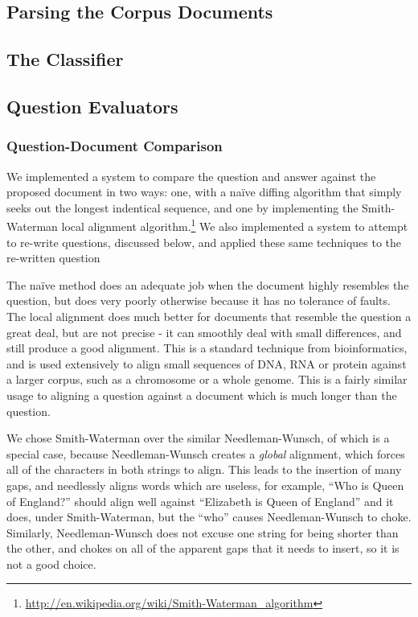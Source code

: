 \documentclass{article}
\begin{document}
\subsection{Parsing the Corpus Documents}

\subsection{The Classifier}

\subsection{Question Evaluators}

\subsubsection{Question-Document Comparison}

	We implemented a system to compare the question and answer against the
	proposed document in two ways:  one, with a na\"ive diffing algorithm that
	simply seeks out the longest indentical sequence, and one by implementing
	the Smith-Waterman local alignment
	algorithm.\footnote{\url{http://en.wikipedia.org/wiki/Smith-Waterman_algorithm}}
	We also implemented a system to attempt to re-write questions, discussed
	below, and applied these same techniques to the re-written question

	The na\"ive method does an adequate job when the document highly resembles
	the question, but does very poorly otherwise because it has no tolerance of
	faults.  The local alignment does much better for documents that resemble
	the question a great deal, but are not precise - it can smoothly deal with
	small differences, and still produce a good alignment.  This is a standard
	technique from bioinformatics, and is used extensively to align small
	sequences of DNA, RNA or protein against a larger corpus, such as a
	chromosome or a whole genome.  This is a fairly similar usage to aligning a
	question against a document which is much longer than the question.

	We chose Smith-Waterman over the similar Needleman-Wunsch, of which is a
	special case, because Needleman-Wunsch creates a \emph{global} alignment,
	which forces all of the characters in both strings to align.  This leads to
	the insertion of many gaps, and needlessly aligns words which are useless,
	for example, ``Who is Queen of England?'' should align well against
	``Elizabeth is Queen of England'' and it does, under Smith-Waterman, but the
	``who'' causes Needleman-Wunsch to choke.  Similarly, Needleman-Wunsch does
	not excuse one string for being shorter than the other, and chokes on all of
	the apparent gaps that it needs to insert, so it is not a good choice.
\end{document}
